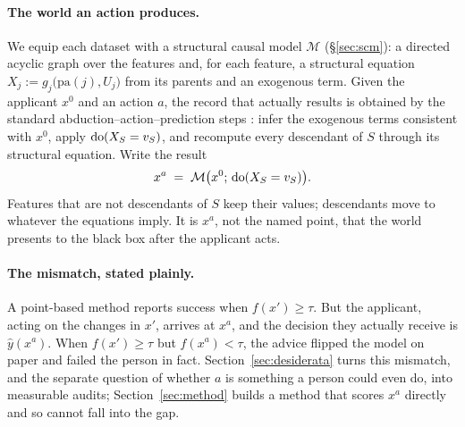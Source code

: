\paragraph{The world an action produces.} We equip each dataset with a structural
causal model $\mathcal{M}$ (\S\ref{sec:scm}): a directed acyclic graph over the
features and, for each feature, a structural equation
$X_j := g_j\big(\mathrm{pa}(j),U_j\big)$ from its parents and an exogenous term.
Given the applicant $x^{0}$ and an action $a$, the record that actually results is
obtained by the standard abduction--action--prediction steps
\citep{pearl2009causality}: infer the exogenous terms consistent with $x^{0}$,
apply $\mathrm{do}(X_S=v_S)$, and recompute every descendant of $S$ through its
structural equation. Write the result
\begin{equation}
  x^{a} \;=\; \mathcal{M}\big(x^{0};\,\mathrm{do}(X_S=v_S)\big).
  \label{eq:propagate}
\end{equation}
Features that are not descendants of $S$ keep their values; descendants move to
whatever the equations imply. It is $x^{a}$, not the named point, that the world
presents to the black box after the applicant acts.

\paragraph{The mismatch, stated plainly.} A point-based method reports success
when $f(x')\ge\tau$. But the applicant, acting on the changes in $x'$, arrives at
$x^{a}$, and the decision they actually receive is $\hat y(x^{a})$. When
$f(x')\ge\tau$ but $f(x^{a})<\tau$, the advice flipped the model on paper and
failed the person in fact. Section~\ref{sec:desiderata} turns this mismatch, and
the separate question of whether $a$ is something a person could even do, into
measurable audits; Section~\ref{sec:method} builds a method that scores $x^{a}$
directly and so cannot fall into the gap.
